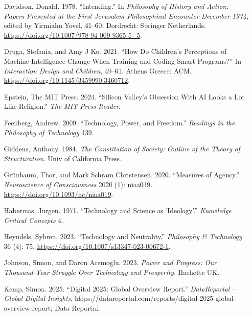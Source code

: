 \documentclass[
  letterpaper,
  DIV=11,
  numbers=noendperiod]{scrartcl}
\newlength{\cslhangindent}
\newenvironment{CSLReferences}[2] %
 {\begin{list}{}{%
  \setlength{\itemindent}{0pt}
  \setlength{\leftmargin}{0pt}
  \setlength{\parsep}{0pt}
  \ifodd #1
   \setlength{\leftmargin}{\cslhangindent}
   \setlength{\itemindent}{-1\cslhangindent}
  \fi
  \setlength{\itemsep}{#2\baselineskip}}}
 {\end{list}}
\begin{document}
\begin{CSLReferences}{1}{0}
Davidson, Donald. 1978. {``Intending.''} In \emph{Philosophy of
{History} and {Action}: {Papers Presented} at the {First Jerusalem
Philosophical Encounter December} 1974}, edited by Yirmiahu Yovel,
41--60. Dordrecht: Springer Netherlands.
\url{https://doi.org/10.1007/978-94-009-9365-5_5}.

Druga, Stefania, and Amy J Ko. 2021. {``How Do Children's Perceptions of
Machine Intelligence Change When Training and Coding Smart Programs?''}
In \emph{Interaction {Design} and {Children}}, 49--61. Athens Greece:
ACM. \url{https://doi.org/10.1145/3459990.3460712}.

Epstein, The MIT Press. 2024. {``Silicon {Valley}'s {Obsession With AI
Looks} a {Lot Like Religion}.''} \emph{The MIT Press Reader}.

Feenberg, Andrew. 2009. {``Technology, Power, and Freedom.''}
\emph{Readings in the Philosophy of Technology} 139.

Giddens, Anthony. 1984. \emph{The Constitution of Society: {Outline} of
the Theory of Structuration}. Univ of California Press.

Grünbaum, Thor, and Mark Schram Christensen. 2020. {``Measures of
Agency.''} \emph{Neuroscience of Consciousness} 2020 (1): niaa019.
\url{https://doi.org/10.1093/nc/niaa019}.

Habermas, Jürgen. 1971. {``Technology and Science as {`Ideology'}.''}
\emph{Knowledge Critical Concepts} 4.

Heyndels, Sybren. 2023. {``Technology and {Neutrality}.''}
\emph{Philosophy \& Technology} 36 (4): 75.
\url{https://doi.org/10.1007/s13347-023-00672-1}.

Johnson, Simon, and Daron Acemoglu. 2023. \emph{Power and {Progress}:
{Our Thousand-Year Struggle Over Technology} and {Prosperity}}. Hachette
UK.

Kemp, Simon. 2025. {``Digital 2025: {Global Overview Report}.''}
\emph{DataReportal -- Global Digital Insights}.
https://datareportal.com/reports/digital-2025-global-overview-report;
Data Reportal.


\end{CSLReferences}
\end{document}

